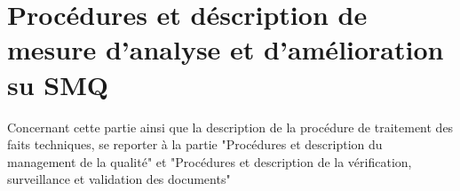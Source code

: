 \section{Procédures et déscription de mesure d'analyse et d'amélioration su SMQ}\label{qualite}

Concernant cette partie ainsi que la description de la procédure de traitement des faits techniques, se reporter à la partie "Procédures et description du management de la qualité" et "Procédures et description de la vérification, surveillance et validation des documents"